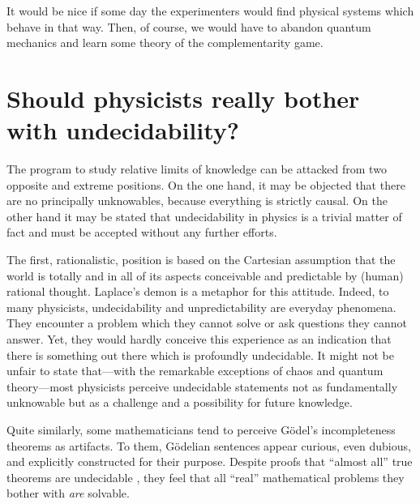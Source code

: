 It would be nice if some day the experimenters would find physical
systems
which behave in that way. Then, of course, we would have to abandon
quantum mechanics and learn some theory of the complementarity game.




\section{Should physicists really bother with undecidability?}

The program to study relative limits of knowledge can be attacked from
two opposite and extreme positions. On the one hand, it may be objected
that there
are no principally unknowables, because everything is strictly causal.
On the other hand it may be stated that undecidability in physics is a
trivial matter of fact and must be accepted without any further efforts.

The first, rationalistic, position
is based on the
Cartesian
assumption
that the world is totally and in all of its aspects conceivable and
predictable by
(human) rational thought. Laplace's demon
\cite{laplace1}
is a metaphor for this attitude.
Indeed, to many physicists, undecidability and unpredictability are
everyday
phenomena. They encounter a problem which they cannot solve or ask
questions they cannot answer.  Yet, they would hardly
conceive this experience as
an indication that there is something out there which is profoundly
undecidable.
It might not be unfair to state that---with the remarkable exceptions of
chaos and quantum theory---most physicists perceive undecidable
statements not as fundamentally unknowable but as a challenge and a
possibility for future knowledge.


Quite similarly, some mathematicians tend to perceive G\"odel's
incompleteness
theorems as artifacts.  To them, G\"odelian sentences appear
curious, even dubious,  and
explicitly constructed for their purpose.
Despite proofs that ``almost all'' true theorems are undecidable
\cite{calude-new}, they feel that all
``real''  mathematical problems they bother with
{\em are} solvable.


